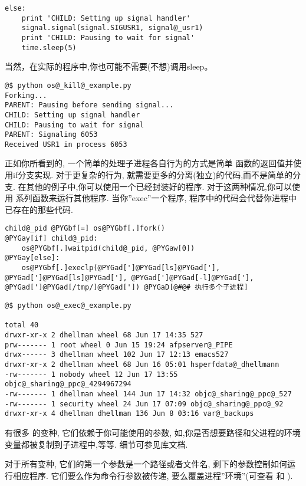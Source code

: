 \documentclass[letterpaper,10pt,english]{manual}
\begin{document}
\begin{Verbatim}[commandchars=@\[\]]
else:
    print 'CHILD: Setting up signal handler'
    signal.signal(signal.SIGUSR1, signal@_usr1)
    print 'CHILD: Pausing to wait for signal'
    time.sleep(5)
\end{Verbatim}

当然，在实际的程序中,你也可能不需要(不想)调用sleep。

\begin{Verbatim}[commandchars=@\[\]]
@$ python os@_kill@_example.py
Forking...
PARENT: Pausing before sending signal...
CHILD: Setting up signal handler
CHILD: Pausing to wait for signal
PARENT: Signaling 6053
Received USR1 in process 6053
\end{Verbatim}

正如你所看到的, 一个简单的处理子进程各自行为的方式是简单  函数的返回值并使用if分支实现. 对于更复杂的行为, 就需要更多的分离(独立)的代码,而不是简单的分支. 在其他的例子中,你可以使用一个已经封装好的程序. 对于这两种情况,你可以使用  系列函数来运行其他程序. 当你''exec''一个程序, 程序中的代码会代替你进程中已存在的那些代码.

\begin{Verbatim}[commandchars=@\[\]]
child@_pid @PYGbf[=] os@PYGbf[.]fork()
@PYGay[if] child@_pid:
    os@PYGbf[.]waitpid(child@_pid, @PYGaw[0])
@PYGay[else]:
    os@PYGbf[.]execlp(@PYGad[']@PYGad[ls]@PYGad['], @PYGad[']@PYGad[ls]@PYGad['], @PYGad[']@PYGad[-l]@PYGad['], @PYGad[']@PYGad[/tmp/]@PYGad[']) @PYGaD[@#@# 执行多个子进程]
\end{Verbatim}

\begin{Verbatim}[commandchars=@\[\]]
@$ python os@_exec@_example.py

total 40
drwxr-xr-x 2 dhellman wheel 68 Jun 17 14:35 527
prw------- 1 root wheel 0 Jun 15 19:24 afpserver@_PIPE
drwx------ 3 dhellman wheel 102 Jun 17 12:13 emacs527
drwxr-xr-x 2 dhellman wheel 68 Jun 16 05:01 hsperfdata@_dhellmann
-rw------- 1 nobody wheel 12 Jun 17 13:55 objc@_sharing@_ppc@_4294967294
-rw------- 1 dhellman wheel 144 Jun 17 14:32 objc@_sharing@_ppc@_527
-rw------- 1 security wheel 24 Jun 17 07:09 objc@_sharing@_ppc@_92
drwxr-xr-x 4 dhellman dhellman 136 Jun 8 03:16 var@_backups
\end{Verbatim}

有很多  的变种, 它们依赖于你可能使用的参数, 如,你是否想要路径和父进程的环境变量都被复制到子进程中,等等. 细节可参见库文档.

对于所有变种, 它们的第一个参数是一个路径或者文件名, 剩下的参数控制如何运行相应程序. 它们要么作为命令行参数被传递, 要么覆盖进程''环境''(可查看  和  ).
\end{document}
